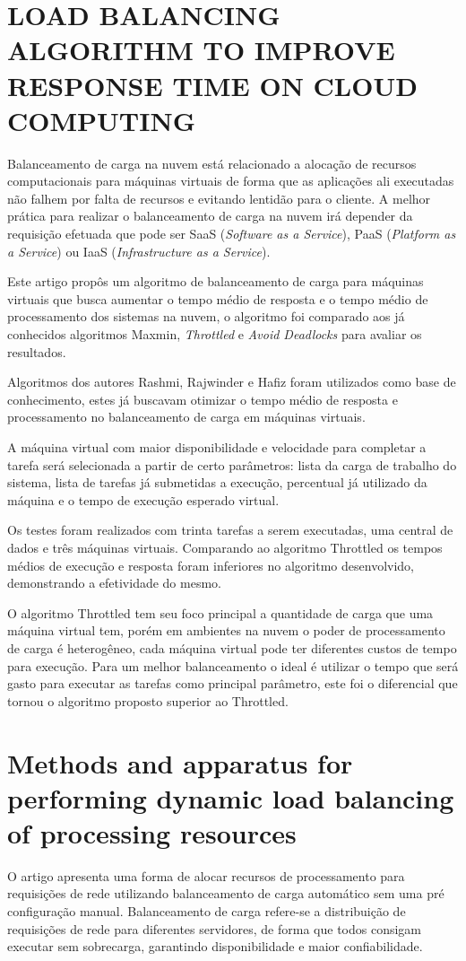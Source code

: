 \section{LOAD BALANCING ALGORITHM TO IMPROVE RESPONSE TIME ON CLOUD COMPUTING}
	Balanceamento de carga na nuvem está relacionado a alocação de recursos computacionais para máquinas virtuais de forma que as aplicações ali executadas não falhem por falta de recursos e evitando lentidão para o cliente. A melhor prática para realizar o balanceamento de carga na nuvem irá depender da requisição efetuada que pode ser SaaS (\textit{Software as a Service}), PaaS (\textit{Platform as a Service}) ou IaaS (\textit{Infrastructure as a Service}).
	
	Este artigo propôs um algoritmo de balanceamento de carga para máquinas virtuais que busca aumentar o tempo médio de resposta e o tempo médio de processamento dos sistemas na nuvem, o algoritmo foi comparado aos já conhecidos algoritmos Maxmin, \textit{Throttled} e \textit{Avoid Deadlocks} para avaliar os resultados.
	
	Algoritmos dos autores Rashmi, Rajwinder e Hafiz foram utilizados como base de conhecimento, estes já buscavam otimizar o tempo médio de resposta e processamento no balanceamento de carga em máquinas virtuais. 
	
	A máquina virtual com maior disponibilidade e velocidade para completar a tarefa será selecionada a partir de certo parâmetros: lista da carga de trabalho do sistema, lista de tarefas já submetidas a execução, percentual já utilizado da máquina e o tempo de execução esperado virtual. 
	
	Os testes foram realizados com trinta tarefas a serem executadas, uma central de dados e três máquinas virtuais. Comparando ao algoritmo Throttled os tempos médios de execução e resposta foram inferiores no algoritmo desenvolvido, demonstrando a efetividade do mesmo.
	
	O algoritmo Throttled tem seu foco principal a quantidade de carga que uma máquina virtual tem, porém em ambientes na nuvem o poder de processamento de carga é heterogêneo, cada máquina virtual pode ter diferentes custos de tempo para execução. Para um melhor balanceamento o ideal é utilizar o tempo que será gasto para executar as tarefas como principal parâmetro, este foi o diferencial que tornou o algoritmo proposto superior ao Throttled.

\section{Methods and apparatus for performing dynamic load balancing of processing resources}
	O artigo apresenta uma forma de alocar recursos de processamento para requisições de rede utilizando balanceamento de carga automático sem uma pré configuração manual. Balanceamento de carga refere-se a distribuição de requisições de rede para diferentes servidores, de forma que todos consigam executar sem sobrecarga, garantindo disponibilidade e maior confiabilidade.
	
